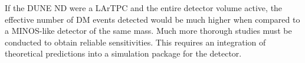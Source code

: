 If the DUNE ND were a LArTPC and the entire
detector volume active, the effective number of DM events detected
would be much higher when compared to a MINOS-like detector of the
same mass. Much more thorough studies must be conducted to obtain
reliable sensitivities. This requires an integration of theoretical
predictions into a simulation package for the detector.
